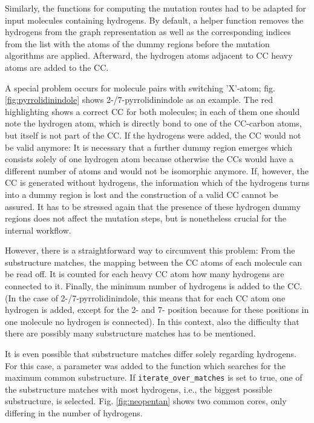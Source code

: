 Similarly, the functions for computing the mutation routes had to be adapted for input molecules containing hydrogens. By default, a helper function removes the hydrogens from the graph representation as well as the corresponding indices from the list with the atoms of the dummy regions before the mutation algorithms are applied. Afterward, the hydrogen atoms adjacent to CC heavy atoms are added to the CC.

A special problem occurs for molecule pairs with switching 'X'-atom; fig. \ref{fig:pyrrolidinindole} shows 2-/7-pyrrolidinindole as an example. The red highlighting shows a correct CC for both molecules; in each of them one should note the hydrogen atom, which is directly bond to one of the CC-carbon atoms, but itself is not part of the CC. If the hydrogens were added, the CC would not be valid anymore: It is necessary that a further dummy region emerges which consists solely of one hydrogen atom because otherwise the CCs would have a different number of atoms and would not be isomorphic anymore. If, however, the CC is generated without hydrogens, the information which of the hydrogens turns into a dummy region is lost and the construction of a valid CC cannot be assured.
It has to be stressed again that the presence of these hydrogen dummy regions does not affect the mutation steps, but is nonetheless crucial for the internal {\trafo} workflow. 

However, there is a straightforward way to circumvent this problem: From the substructure matches, the mapping between the CC atoms of each molecule can be read off. It is counted for each heavy CC atom how many hydrogens are connected to it. Finally, the minimum number of hydrogens is added to the CC. (In the case of 2-/7-pyrrolidinindole, this means that for each CC atom one hydrogen is added, except for the 2- and 7- position because for these positions in one molecule no hydrogen is connected).
In this context, also the difficulty that there are possibly many substructure matches has to be mentioned.

It is even possible that substructure matches differ solely regarding hydrogens. For this case, a parameter was added to the function which searches for the maximum common substructure. If \texttt{iterate\_over\_matches} is set to true, one of the substructure matches with most hydrogens, i.e., the biggest possible substructure, is selected. Fig. \ref{fig:neopentan} shows two common cores, only differing in the number of hydrogens.


